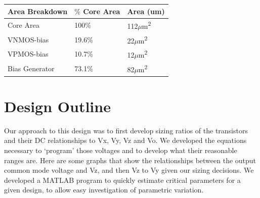 \documentclass[12pt,a4paper]{article}
\begin{document}
\begin{table}[h]
	\centering
	\begin{tabular}{ | l | l | l |}
		\hline
		\textbf{Area Breakdown} & $\%$ Core Area & Area (um)\\
		\hline
			Core Area & 100\% & 112$\mu$m\textsuperscript{2}  \\
		\hline
			VNMOS-bias & 19.6\% & 22$\mu$m\textsuperscript{2} \\
		\hline
			VPMOS-bias  & 10.7\%  & 12$\mu$m\textsuperscript{2} \\
		\hline
			Bias Generator & 73.1\% &  82$\mu$m\textsuperscript{2} \\
		\hline
	\end{tabular}
\end{table}

\pagebreak



\section{Design Outline}
\par
Our approach to this design was to first develop sizing ratios of the transistors and their DC relationships to Vx, Vy, Vz and Vo.
We developed the equations necessary to `program' those voltages and to develop what their reasonable ranges are.
Here are some graphs that show the relationships between the output common mode voltage and Vz, and then Vz to Vy given our sizing decisions.
We developed a MATLAB program to quickly estimate critical parameters for a given design, to allow easy investigation of parametric variation.\par
\end{document}

